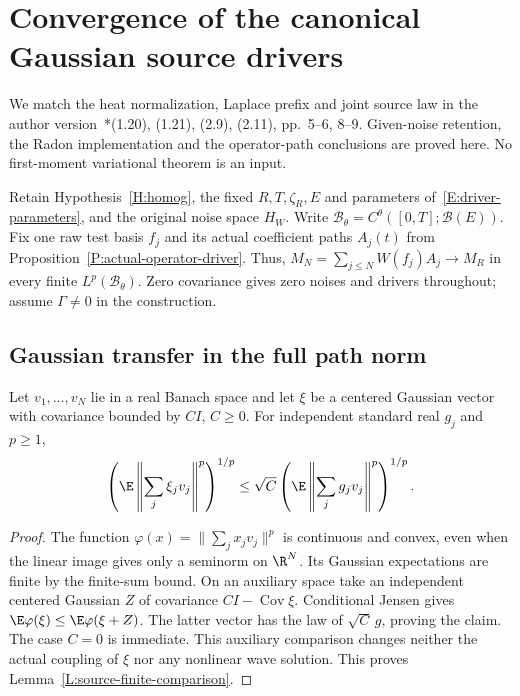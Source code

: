 \section{Convergence of the canonical Gaussian source drivers}
\label{S:source-driver-convergence}

We match the heat normalization, Laplace prefix and joint source law in
the author version~\cite{chen:author2026:time-dependency}*{(1.20), (1.21),
(2.9), (2.11), pp.~5--6, 8--9}. Given-noise retention, the Radon
implementation and the operator-path conclusions are proved here.
No first-moment variational theorem is an input.

Retain Hypothesis~\ref{H:homog}, the fixed $R,T,\zeta_R,E$ and parameters
of~\eqref{E:driver-parameters}, and the original noise space $H_W$.
Write $\mathscr B_\theta=C^\theta([0,T];\mathcal B(E))$.
Fix one raw test basis $f_j$ and its actual coefficient paths $A_j(t)$
from Proposition~\ref{P:actual-operator-driver}. Thus,
$M_N=\sum_{j\le N}W(f_j)A_j\to M_R$ in every finite $L^p(\mathscr B_\theta)$.
Zero covariance gives zero noises and drivers throughout; assume
$\Gamma\ne0$ in the construction.

\subsection{Gaussian transfer in the full path norm}

\begin{lemma}\label{L:source-finite-comparison}
  Let $v_1,\ldots,v_N$ lie in a real Banach space and let $\xi$ be a
  centered Gaussian vector with covariance bounded by $CI$, $C\ge0$.
  For independent standard real $g_j$ and $p\ge1$,
  \begin{equation}\label{E:source-finite-comparison}
    \left(\E\left\|\sum_j\xi_jv_j\right\|^p\right)^{1/p}
    \le\sqrt C\left(\E\left\|\sum_jg_jv_j\right\|^p\right)^{1/p}.
  \end{equation}
\end{lemma}

\begin{proof}
  The function $\varphi(x)=\|\sum_jx_jv_j\|^p$ is continuous and convex,
  even when the linear image gives only a seminorm on $\R^N$.
  Its Gaussian expectations are finite by the finite-sum bound.
  On an auxiliary space take an independent centered Gaussian $Z$ of
  covariance $CI-\operatorname{Cov}\xi$. Conditional Jensen gives
  $\E\varphi(\xi)\le\E\varphi(\xi+Z)$. The latter vector has the law of
  $\sqrt C\,g$, proving the claim. The case $C=0$ is immediate.
  This auxiliary comparison changes neither the actual coupling of $\xi$
  nor any nonlinear wave solution.
  This proves Lemma~\ref{L:source-finite-comparison}.
\end{proof}

